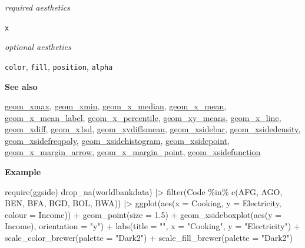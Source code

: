 \documentclass[
  letterpaper,
  DIV=11,
  numbers=noendperiod]{scrreprt}
\newenvironment{Shaded}{\begin{snugshade}}{\end{snugshade}}
\newcommand{\AttributeTok}[1]{\textcolor[rgb]{0.40,0.45,0.13}{#1}}
\newcommand{\FloatTok}[1]{\textcolor[rgb]{0.68,0.00,0.00}{#1}}
\newcommand{\FunctionTok}[1]{\textcolor[rgb]{0.28,0.35,0.67}{#1}}
\newcommand{\NormalTok}[1]{\textcolor[rgb]{0.00,0.23,0.31}{#1}}
\newcommand{\SpecialCharTok}[1]{\textcolor[rgb]{0.37,0.37,0.37}{#1}}
\newcommand{\StringTok}[1]{\textcolor[rgb]{0.13,0.47,0.30}{#1}}
\begin{document}
\emph{required aesthetics}

\texttt{x}

\emph{optional aesthetics}

\texttt{color}, \texttt{fill}, \texttt{position}, \texttt{alpha}

\textbf{See also}

\href{@xmax}{geom\_xmax}, \href{@xmin}{geom\_xmin},
\href{@x_median}{geom\_x\_median}, \href{@x_mean}{geom\_x\_mean},
\href{@x_mean_label}{geom\_x\_mean\_label},
\href{@x_percentile}{geom\_x\_percentile},
\href{@xy_means}{geom\_xy\_means}, \href{@x_line}{geom\_x\_line},
\href{@xdiff}{geom\_xdiff}, \href{@x1sd}{geom\_x1sd},
\href{@xydiffsmean}{geom\_xydiffsmean},
\href{@xsidebar}{geom\_xsidebar},
\href{@xsidedensity}{geom\_xsidedensity},
\href{@xsidefreqpoly}{geom\_xsidefreqpoly},
\href{@xsidehistogram}{geom\_xsidehistogram},
\href{@xsidepoint}{geom\_xsidepoint},
\href{@x_margin_arrow}{geom\_x\_margin\_arrow},
\href{@x_margin_point}{geom\_x\_margin\_point},
\href{@xsidefunction}{geom\_xsidefunction}

\textbf{Example}

\begin{Shaded}
\begin{Highlighting}[]
\FunctionTok{require}\NormalTok{(ggside)}
\FunctionTok{drop\_na}\NormalTok{(worldbankdata) }\SpecialCharTok{|\textgreater{}}
  \FunctionTok{filter}\NormalTok{(Code }\SpecialCharTok{\%in\%} \FunctionTok{c}\NormalTok{(}\StringTok{\textquotesingle{}AFG\textquotesingle{}}\NormalTok{, }\StringTok{\textquotesingle{}AGO\textquotesingle{}}\NormalTok{, }\StringTok{\textquotesingle{}BEN\textquotesingle{}}\NormalTok{, }\StringTok{\textquotesingle{}BFA\textquotesingle{}}\NormalTok{, }\StringTok{\textquotesingle{}BGD\textquotesingle{}}\NormalTok{, }\StringTok{\textquotesingle{}BOL\textquotesingle{}}\NormalTok{, }\StringTok{\textquotesingle{}BWA\textquotesingle{}}\NormalTok{)) }\SpecialCharTok{|\textgreater{}}
  \FunctionTok{ggplot}\NormalTok{(}\FunctionTok{aes}\NormalTok{(}\AttributeTok{x =}\NormalTok{ Cooking, }\AttributeTok{y =}\NormalTok{ Electricity, }\AttributeTok{colour =}\NormalTok{ Income)) }\SpecialCharTok{+}
  \FunctionTok{geom\_point}\NormalTok{(}\AttributeTok{size =} \FloatTok{1.5}\NormalTok{) }\SpecialCharTok{+} 
  \FunctionTok{geom\_xsideboxplot}\NormalTok{(}\FunctionTok{aes}\NormalTok{(}\AttributeTok{y =}\NormalTok{ Income), }\AttributeTok{orientation =} \StringTok{"y"}\NormalTok{) }\SpecialCharTok{+}
  \FunctionTok{labs}\NormalTok{(}\AttributeTok{title =} \StringTok{""}\NormalTok{, }\AttributeTok{x =} \StringTok{"Cooking"}\NormalTok{, }\AttributeTok{y =} \StringTok{"Electricity"}\NormalTok{)  }\SpecialCharTok{+} \FunctionTok{scale\_color\_brewer}\NormalTok{(}\AttributeTok{palette =} \StringTok{"Dark2"}\NormalTok{) }\SpecialCharTok{+} \FunctionTok{scale\_fill\_brewer}\NormalTok{(}\AttributeTok{palette =} \StringTok{"Dark2"}\NormalTok{)}
\end{Highlighting}
\end{Shaded}
\end{document}
